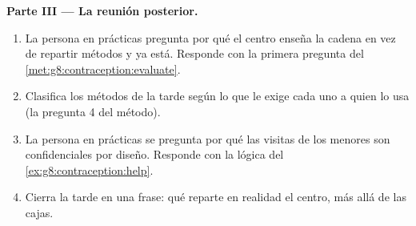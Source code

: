 \begin{problem}
\medskip\noindent\textbf{Parte III --- La reunión posterior.}
\begin{enumerate}[resume]
  \item La persona en prácticas pregunta por qué el centro enseña la
        cadena en vez de repartir métodos y ya está. Responde con la
        primera pregunta del \cref{met:g8:contraception:evaluate}.
  \item Clasifica los métodos de la tarde según lo que le exige cada
        uno a quien lo usa (la pregunta 4 del método).
  \item La persona en prácticas se pregunta por qué las visitas de los
        menores son confidenciales por diseño. Responde con la lógica
        del \cref{ex:g8:contraception:help}.
  \item Cierra la tarde en una frase: qué reparte en realidad el
        centro, más allá de las cajas.
\end{enumerate}
\end{problem}
